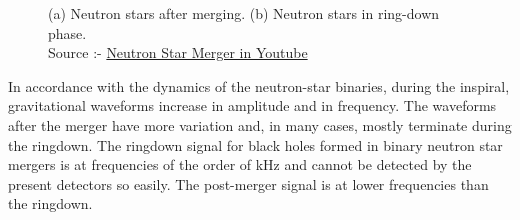 \begin{figure}[h]
    \centering
    \qquad
    \caption{(a) Neutron stars after merging. (b) Neutron stars in ring-down phase. \\ Source :- \href{https://youtu.be/y8VDwGi0r0E}{Neutron Star Merger in Youtube}} 
\end{figure}

In accordance with the dynamics of the neutron-star binaries, during the inspiral, gravitational waveforms increase in amplitude and in frequency. 
The waveforms after the merger have more variation and, in many cases, mostly terminate during the ringdown. The ringdown signal for black holes formed in binary neutron star mergers is at frequencies of the order of kHz and cannot be detected by the present detectors so easily. The post-merger signal is at lower frequencies than the ringdown.

